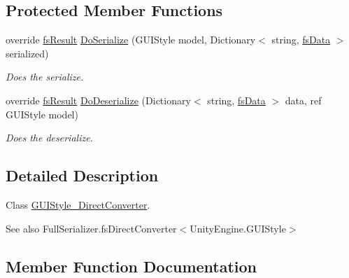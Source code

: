 \subsection*{Protected Member Functions}
\begin{DoxyCompactItemize}
\item 
override \hyperlink{struct_full_serializer_1_1fs_result}{fs\+Result} \hyperlink{class_full_serializer_1_1_internal_1_1_direct_converters_1_1_g_u_i_style___direct_converter_aad30e70d6777a78e62406c4072e45eac}{Do\+Serialize} (G\+U\+I\+Style model, Dictionary$<$ string, \hyperlink{class_full_serializer_1_1fs_data}{fs\+Data} $>$ serialized)
\begin{DoxyCompactList}\small\item\em Does the serialize. \end{DoxyCompactList}\item 
override \hyperlink{struct_full_serializer_1_1fs_result}{fs\+Result} \hyperlink{class_full_serializer_1_1_internal_1_1_direct_converters_1_1_g_u_i_style___direct_converter_a99d5f6622d24b284ce9a032f493ba1d2}{Do\+Deserialize} (Dictionary$<$ string, \hyperlink{class_full_serializer_1_1fs_data}{fs\+Data} $>$ data, ref G\+U\+I\+Style model)
\begin{DoxyCompactList}\small\item\em Does the deserialize. \end{DoxyCompactList}\end{DoxyCompactItemize}


\subsection{Detailed Description}
Class \hyperlink{class_full_serializer_1_1_internal_1_1_direct_converters_1_1_g_u_i_style___direct_converter}{G\+U\+I\+Style\+\_\+\+Direct\+Converter}. 

\begin{DoxySeeAlso}{See also}
Full\+Serializer.\+fs\+Direct\+Converter$<$\+Unity\+Engine.\+G\+U\+I\+Style$>$


\end{DoxySeeAlso}


\subsection{Member Function Documentation}
\mbox{\label{class_full_serializer_1_1_internal_1_1_direct_converters_1_1_g_u_i_style___direct_converter_a6e9709e22125ee8f1f11449524257748}} 
